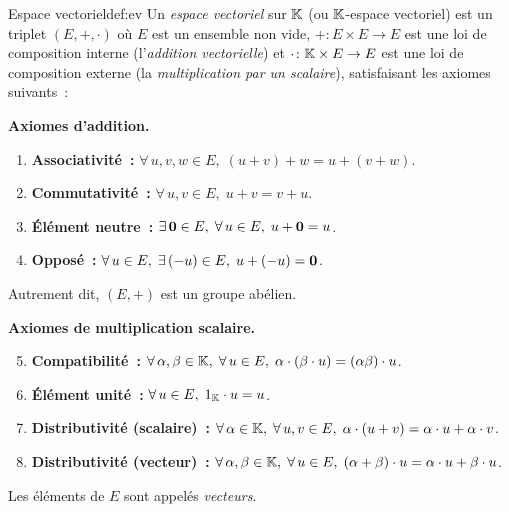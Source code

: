 \begin{definition}{Espace vectoriel}{def:ev}
  Un \emph{espace vectoriel} sur ${\mathbb{K}}$ (ou
  ${\mathbb{K}}$-espace vectoriel) est un triplet $(E,+,\cdot)$ où $E$ est un
  ensemble non vide, $+\colon E\times E\to E$ est une loi de composition
  interne (l'\emph{addition vectorielle}) et
  $\cdot\colon{\mathbb{K}}\times E\to E$ est une loi de composition externe (la
  \emph{multiplication par un scalaire}),
  satisfaisant les axiomes suivants~:

  \medskip
  \noindent\textbf{Axiomes d'addition.}
  \begin{enumerate}[label=\textbf{(EV\arabic*)}]
    \item\label{ax:ev-assoc} \textbf{Associativité~:}
      $\forall\, u,v,w\in E,\; (u+v)+w = u+(v+w)$.
    \item\label{ax:ev-comm} \textbf{Commutativité~:}
      $\forall\, u,v\in E,\; u+v = v+u$.
    \item\label{ax:ev-neutre} \textbf{Élément neutre~:}
      $\exists\, \mathbf{0}\in E,\;\forall\, u\in E,\; u+\mathbf{0} = u$.
    \item\label{ax:ev-oppose} \textbf{Opposé~:}
      $\forall\, u\in E,\;\exists\, (-u)\in E,\; u+(-u) = \mathbf{0}$.
  \end{enumerate}
  Autrement dit, $(E,+)$ est un groupe abélien.

  \medskip
  \noindent\textbf{Axiomes de multiplication scalaire.}
  \begin{enumerate}[label=\textbf{(EV\arabic*)}]
    \setcounter{enumi}{4}
    \item\label{ax:ev-compat} \textbf{Compatibilité~:}
      $\forall\, \alpha,\beta\in{\mathbb{K}},\;\forall\, u\in E,\;
      \alpha\cdot(\beta\cdot u) = (\alpha\beta)\cdot u$.
    \item\label{ax:ev-unite} \textbf{Élément unité~:}
      $\forall\, u\in E,\; 1_{\mathbb{K}}\cdot u = u$.
    \item\label{ax:ev-dist1} \textbf{Distributivité (scalaire)~:}
      $\forall\, \alpha\in{\mathbb{K}},\;\forall\, u,v\in E,\;
      \alpha\cdot(u+v) = \alpha\cdot u + \alpha\cdot v$.
    \item\label{ax:ev-dist2} \textbf{Distributivité (vecteur)~:}
      $\forall\, \alpha,\beta\in{\mathbb{K}},\;\forall\, u\in E,\;
      (\alpha+\beta)\cdot u = \alpha\cdot u + \beta\cdot u$.
  \end{enumerate}
  Les éléments de $E$ sont appelés \emph{vecteurs}.
\end{definition}

